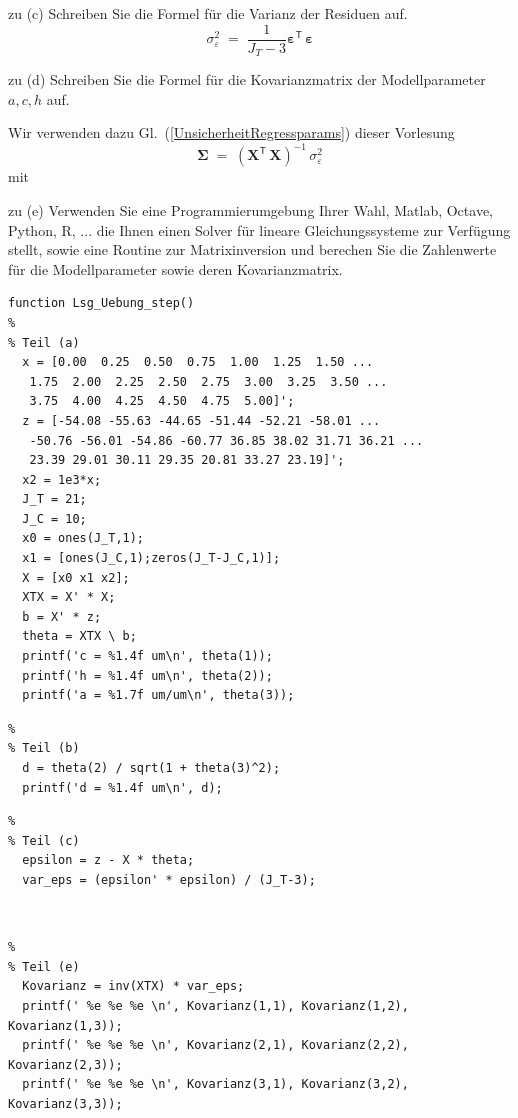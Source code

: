 zu (c) Schreiben Sie die Formel für die Varianz der Residuen auf.
$$
\sigma_\varepsilon^2 \; = \; \frac{1}{J_T - 3} \boldsymbol \varepsilon^\mathsf{T} \, \boldsymbol \varepsilon
$$

zu (d) Schreiben Sie die Formel für die Kovarianzmatrix der Modellparameter
$a, c, h$ auf.

Wir verwenden dazu Gl.~(\ref{UnsicherheitRegressparams}) dieser Vorlesung
\begin{equation}
\boldsymbol \Sigma \; = \; \left( \mathbf{X}^\mathsf{T}  \, \mathbf{X} \right)^{-1} \, \sigma_\varepsilon^2
\end{equation}
mit 

zu (e) Verwenden Sie eine Programmierumgebung Ihrer Wahl, Matlab, Octave, Python, R, ...
die Ihnen einen Solver für lineare Gleichungssysteme zur Verfügung stellt, sowie
eine Routine zur Matrixinversion und berechen Sie die Zahlenwerte für die Modellparameter
sowie deren Kovarianzmatrix.

\begin{verbatim}
function Lsg_Uebung_step()
%
% Teil (a)
  x = [0.00  0.25  0.50  0.75  1.00  1.25  1.50 ...
   1.75  2.00  2.25  2.50  2.75  3.00  3.25  3.50 ...
   3.75  4.00  4.25  4.50  4.75  5.00]';
  z = [-54.08 -55.63 -44.65 -51.44 -52.21 -58.01 ...
   -50.76 -56.01 -54.86 -60.77 36.85 38.02 31.71 36.21 ...
   23.39 29.01 30.11 29.35 20.81 33.27 23.19]';
  x2 = 1e3*x;
  J_T = 21;
  J_C = 10;
  x0 = ones(J_T,1);
  x1 = [ones(J_C,1);zeros(J_T-J_C,1)];
  X = [x0 x1 x2];
  XTX = X' * X;
  b = X' * z;
  theta = XTX \ b;
  printf('c = %1.4f um\n', theta(1));
  printf('h = %1.4f um\n', theta(2));
  printf('a = %1.7f um/um\n', theta(3));
\end{verbatim}
\begin{verbatim}
%
% Teil (b)
  d = theta(2) / sqrt(1 + theta(3)^2);
  printf('d = %1.4f um\n', d);
\end{verbatim}
\begin{verbatim}
%
% Teil (c)
  epsilon = z - X * theta;
  var_eps = (epsilon' * epsilon) / (J_T-3);
\end{verbatim}

~\\

\begin{verbatim}
%
% Teil (e)
  Kovarianz = inv(XTX) * var_eps;
  printf(' %e %e %e \n', Kovarianz(1,1), Kovarianz(1,2), Kovarianz(1,3));
  printf(' %e %e %e \n', Kovarianz(2,1), Kovarianz(2,2), Kovarianz(2,3));
  printf(' %e %e %e \n', Kovarianz(3,1), Kovarianz(3,2), Kovarianz(3,3));
\end{verbatim}

